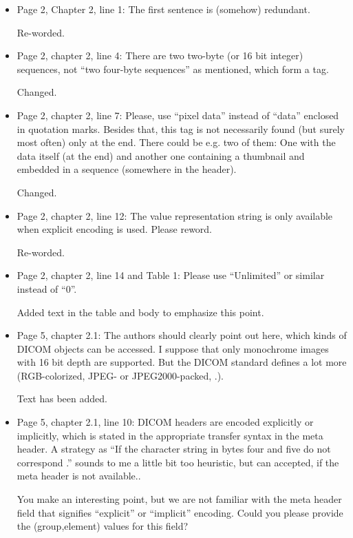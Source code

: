 \documentclass[11pt]{article}
\begin{document}
\begin{itemize}

\item Page 2, Chapter 2, line 1: The first sentence is (somehow)
  redundant.

  Re-worded.

\item Page 2, chapter 2, line 4: There are two two-byte (or 16 bit
  integer) sequences, not ``two four-byte sequences'' as mentioned,
  which form a tag.

  Changed.

\item Page 2, chapter 2, line 7: Please, use ``pixel data'' instead of
  ``data'' enclosed in quotation marks. Besides that, this tag is not
  necessarily found (but surely most often) only at the end. There
  could be e.g. two of them: One with the data itself (at the end) and
  another one containing a thumbnail and embedded in a sequence
  (somewhere in the header).

  Changed.

\item Page 2, chapter 2, line 12: The value representation string is
  only available when explicit encoding is used. Please reword.

  Re-worded.

\item Page 2, chapter 2, line 14 and Table 1: Please use ``Unlimited''
  or similar instead of ``0''.

  Added text in the table and body to emphasize this point.

\item Page 5, chapter 2.1: The authors should clearly point out here,
  which kinds of DICOM objects can be accessed. I suppose that only
  monochrome images with 16 bit depth are supported. But the DICOM
  standard defines a lot more (RGB-colorized, JPEG- or
  JPEG2000-packed, .).

  Text has been added.

\item Page 5, chapter 2.1, line 10: DICOM headers are encoded
  explicitly or implicitly, which is stated in the appropriate
  transfer syntax in the meta header.  A strategy as ``If the
  character string in bytes four and five do not correspond .'' sounds
  to me a little bit too heuristic, but can accepted, if the meta
  header is not available..

  You make an interesting point, but we are not familiar with the meta
  header field that signifies ``explicit'' or ``implicit'' encoding.
  Could you please provide the (group,element) values for this field?


\end{itemize}
\end{document}
